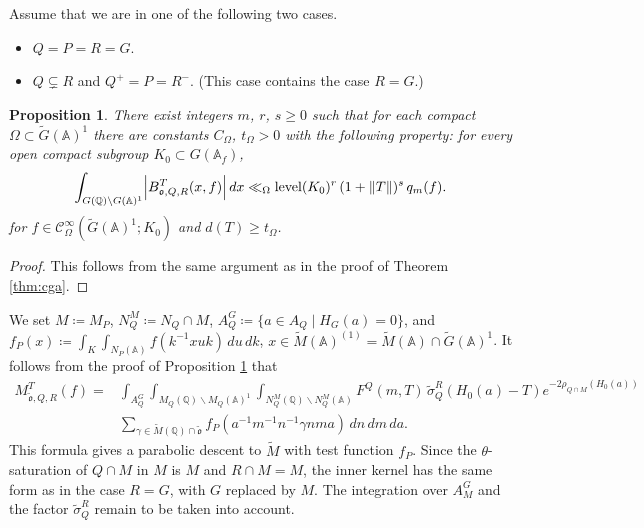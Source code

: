 \documentclass[12pt]{amsart}
\theoremstyle{definition}
\theoremstyle{plain}
\newtheorem{proposition}[definition]{Proposition}
\theoremstyle{remark}
\def\Q{\mathbb{Q}}%
\def\A{\mathbb{A}}%
\def\bs{\backslash}%
\newcommand{\fo}{\mathfrak{o}}
\newcommand{\cC}{\mathcal{C}}
\numberwithin{equation}{section}
\newcommand{\tG}{\widetilde{G}}
\newcommand{\tM}{\widetilde{M}}
\newcommand{\tsigma}{\widetilde{\sigma}}
\newcommand{\tfo}{\widetilde{\mathfrak{o}}}
\newcommand{\level}{\operatorname{level}}
\begin{document}
Assume that we are in one of the following two cases.
\begin{itemize}
    \item $Q=P=R=G$.
    \item $Q\subsetneq R$ and $Q^+=P=R^-$. (This case contains the case $R=G$.)
\end{itemize}
\begin{proposition}\label{prop:onetermconvergence}
There exist integers $m$, $r$, $s\geq0$ such that for each compact $\Omega\subset\tG(\A)^1$ there
are constants $C_\Omega$, $t_\Omega>0$ with the following property:
for every open compact subgroup $K_0\subset G(\A_f)$,
\[
\int_{G(\Q)\bs G(\A)^1} \Bigl| B^T_{\fo,Q,R}(x,f) \Bigr|\, dx \ll_{\Omega}\level(K_0)^r\,  (1+\|T\|)^s \, q_m(f) .
\]
for $f\in\cC_\Omega^\infty(\tG(\A)^1;K_0)$ and $d(T)\geq t_\Omega$.
\end{proposition}
\begin{proof}
This follows from the same argument as in the proof of Theorem \ref{thm:cga}.
\end{proof}
We set $M\coloneqq M_P$, $N_Q^M\coloneqq N_Q\cap M$, $A_Q^G\coloneqq \{ a\in A_{Q} \mid H_G(a)=0 \}$, and $f_{P}(x)\coloneqq \int_K \int_{N_P(\A)}f(k^{-1} x u k)\,du \, dk$, $x\in\tM(\A)^{(1)}=\tM(\A)\cap\tG(\A)^1$. 
It follows from the proof of Proposition \ref{prop:onetermconvergence} that
\begin{align*}
     M_{\tfo,Q,R}^T(f)
 ={}&\int_{A_Q^G}\int_{M_Q(\Q)\backslash M_Q(\A)^1} \int_{N_Q^M(\Q)\backslash N_Q^M(\A)} F^Q(m,T)\, \tsigma_Q^R(H_0(a)-T)      e^{-2\rho_{Q\cap M}(H_0(a))}\\
    &    \sum_{\gamma\in\tM(\Q)\cap \tfo} f_{P}(a^{-1}m^{-1}n^{-1}\gamma nma )
          \,dn \, dm \, da.
\end{align*}
This formula gives a parabolic descent to $\tM$ with test function $f_P$.
Since the $\theta$-saturation of $Q\cap M$ in $M$ is $M$ and $R\cap M=M$, the inner kernel has the same form as in the case $R=G$, with $G$ replaced by $M$.
The integration over $A_M^G$ and the factor $\widetilde\sigma_Q^R$ remain to be taken into account.
\end{document}
